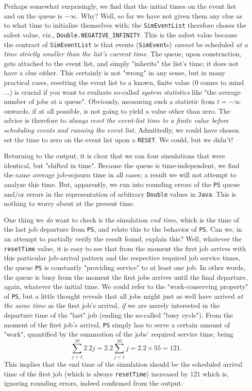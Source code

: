 Perhaps somewhat surprisingly,
we find that the initial times on the event list
and on the queue is $-\infty$.
Why? Well, so far we have not given them any clue as to
what time to initialize themselves with;
the \lstinline|SimEventList| therefore
choses the safest value, viz., \lstinline|Double.NEGATIVE_INFINITY|.
This is the safest value
because the contract of \lstinline|SimEventList| is that
events (\lstinline|SimEvent|s) {\em cannot\/}
be scheduled {\em at a time strictly smaller than the list's current time}.
The queue, upon construction, gets attached to the event list,
and simply "inherits" the list's time;
it does not have a clue either.
This certainly is not "wrong" in any sense,
but in many practical cases,
resetting the event list to a
known, finite value ($0$ comes to mind$\ldots$)
is crucial if you want to evaluate
so-called {\em system statistics}
like "the average number of jobs at a queue".
Obviously, measuring such a statistic from $t=-\infty$ onwards,
if at all possible,
is not going to yield a value other than zero.
The advice is therefore to
{\em always reset the event-list time to a finite value
	before scheduling events and running the event list.}
Admittedly, we could have chosen set the time to zero
on the event list upon a \lstinline|RESET|.
We could, but we didn't!

Returning to the output,
it is clear that we ran four simulations
that were identical, but "shifted in time".
Because the queue is time-independent,
we find the same average job-sojourn time
in all cases;
a result we will not attempt to analyze this time.
But,
apparently,
we run into rounding errors of the \lstinline|PS| queue
and/or errors in the representation of
arbitrary \lstinline|Double| values in \lstinline|Java|.
This is nothing to worry about at the present time.

One thing we {\em do\/} want to check is the simulation {\em end time\/},
which is the time of the last job departure from \lstinline|PS|,
and relate this to the behavior of \lstinline|PS|.
Can we, in an attempt to partially verify the result found, explain this?
Well, whatever the \lstinline|resetTime| value,
it is easy to see that from the moment the first job
arrives with this particular job-arrival pattern
and the respective required job service times,
the queue \lstinline|PS|
is constantly "providing service" to at least one job.
In other words, the queue is busy from the moment
the first jobs arrives until the final departure,
again, whatever the initial time.
We could refer to the "work-conserving property" of
\lstinline|PS|, but a little thought reveals
that all jobs might just as well have arrived
{\em at the same time\/} as the first job's arrival,
{\em if\/} we are merely interested in the departure time of
the "last" job (ending the so-called "busy cycle").
From the moment of the first job's arrival,
\lstinline|PS| simply has to serve
a certain amount of "work",
quantified by the summation of the jobs'
required service time,
being
\[
\sum_{j=1}^{10} 2.2j = 2.2 \sum_{j=1}^{10} j = 2.2 \times 55 = 121.
\]
This implies that the end time of the simulation should
be the scheduled arrival time of the first job
(which is always \lstinline|resetTime|)
increased by $121$
which is,
ignoring rounding errors,
indeed confirmed from the output.

